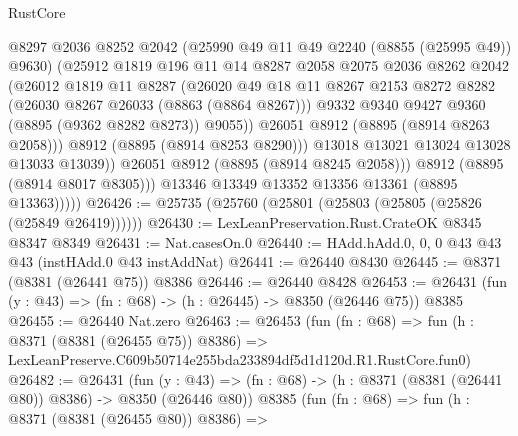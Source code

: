 \begin{lexlean}{RustCore}
\begin{coremodule}
                      @8297
                      @2036
                      @8252
                      @2042
                      (@25990 @49 @11 @49 @2240 (@8855 (@25995 @49)) @9630)
                      (@25912
                        @1819
                        @196
                        @11
                        @14
                        @8287
                        @2058
                        @2075
                        @2036
                        @8262
                        @2042
                        (@26012
                          @1819
                          @11
                          @8287
                          (@26020
                            @49
                            @18
                            @11
                            @8267
                            @2153
                            @8272
                            @8282
                            (@26030 @8267 @26033 (@8863 (@8864 @8267)))
                            @9332
                            @9340
                            @9427
                            @9360
                            (@8895 (@9362 @8282 @8273))
                            @9055))
                        @26051
                        @8912
                        (@8895 (@8914 @8263 @2058)))
                      @8912
                      (@8895 (@8914 @8253 @8290)))
                    @13018
                    @13021
                    @13024
                    @13028
                    @13033
                    @13039))
                @26051
                @8912
                (@8895 (@8914 @8245 @2058)))
              @8912
              (@8895 (@8914 @8017 @8305)))
            @13346
            @13349
            @13352
            @13356
            @13361
            (@8895 @13363)))))
@26426 := @25735 (@25760 (@25801 (@25803 (@25805 (@25826 (@25849 @26419))))))
@26430 := LexLeanPreservation.Rust.CrateOK @8345 @8347 @8349
@26431 := Nat.casesOn.{0}
@26440 := HAdd.hAdd.{0, 0, 0} @43 @43 @43 (instHAdd.{0} @43 instAddNat)
@26441 := @26440 @8430
@26445 := @8371 (@8381 (@26441 @75)) @8386
@26446 := @26440 @8428
@26453 := @26431 (fun (y : @43) => (fn : @68) -> (h : @26445) -> @8350 (@26446 @75)) @8385
@26455 := @26440 Nat.zero
@26463 := @26453
    (fun (fn : @68) =>
    fun (h : @8371 (@8381 (@26455 @75)) @8386) =>
    LexLeanPreserve.C609b50714e255bda233894df5d1d120d.R1.RustCore.fun0)
@26482 := @26431
    (fun (y : @43) => (fn : @68) -> (h : @8371 (@8381 (@26441 @80)) @8386) -> @8350 (@26446 @80))
    @8385
    (fun (fn : @68) =>
    fun (h : @8371 (@8381 (@26455 @80)) @8386) =>

\end{coremodule}
\end{lexlean}
